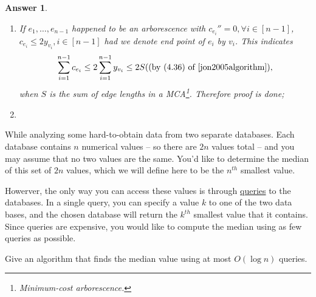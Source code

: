 \documentclass[11pt]{article}
\theoremstyle{numberplain}
\theoremstyle{nonumberplain}
\newtheorem{rem}{Remark}
\newtheorem{ans}{Answer}
\newcommand{\0}{{\mathbf{0}}}
\begin{document}
\begin{ans}
\begin{enumerate}
Notice $F''\cap F'=(F\cap F')\cup \{\vec{e}\}$.
A sequence of these operations transform $(V,F)$ into $(V,F')$ one edge at a time.
But each of these operations changes the cost of the
arborescence by at most $1$ (since all edges have cost $0$ or $1$).
So if we let $(V,F)$ be a minimum-cost arborescence (of cost $a$)
and we let $(V,F')$ be a maximum-cost arborescence (of cost $b$),
then if $a \leq k \leq b$, there must be an
arborescence of cost exactly $k$.

\begin{rem} \textcolor{red}{Is that true that a strong component might contain a circle?}
\end{rem}
\item If $e_1,\ldots,e_{n-1}$ happened to be an arborescence with $c_{e_i}''=0,\forall i\in[n-1]$, $c_{e_i}\leq 2y_{v_i},i\in[n-1]$ had we denote end point of $e_i$ by $v_i$. This indicates
$$
\sum_{i=1}^{n-1}c_{e_i}\leq 2\sum_{i=1}^{n-1}y_{v_i}\leq 2 S (\text{(by (4.36) of \cite{jon2005algorithm})},
$$
	when $S$ is the sum of edge lengths in a MCA\footnote{Minimum-cost arborescence.}. Therefore proof is done;
	\item 
\end{enumerate}
\end{ans}
\begin{ques}[HW3,5-1] While analyzing some hard-to-obtain data from two separate databases. Each database contains $n$ numerical values -- so there are $2n$ values total -- and you may assume that no two values are the same. You'd like to determine the median of this set of $2n$ values, which we will define here to be the $n^{th}$ smallest value. \par
Howerver, the only way you can access these values is through \underline{queries} to the databases. In a single query, you can specify a value $k$ to one of the two data bases, and the chosen database will return the $k^{th}$ smallest value that it contains. Since queries are expensive, you would like to compute the median using as few queries as possible.\par 
Give an algorithm that finds the median value using at most $O(\log n)$ queries.
\end{ques}
\end{document}
